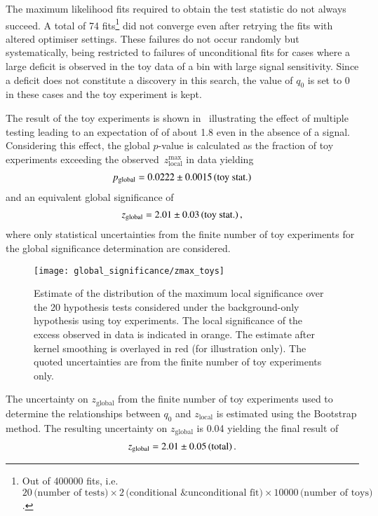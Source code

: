 The maximum likelihood fits required to obtain the test statistic do not always
succeed. A total of \num{74} fits\footnote{Out of \num{400000} fits, i.e.\
  $20\,\text{(number of tests)} \times 2\,\text{(conditional \& unconditional
    fit)} \times \num{10000}\,\text{(number of toys)}$.}  did not converge even
after retrying the fits with altered optimiser settings. These failures do not
occur randomly but systematically, being restricted to failures of unconditional
fits for cases where a large deficit is observed in the toy data of a bin with
large signal sensitivity. Since a deficit does not constitute a discovery in
this search, the value of $q_0$ is set to 0 in these cases and the toy
experiment is kept.

The result of the toy experiments is shown in~ illustrating
the effect of multiple testing leading to an expectation of \Zmaxlocal of about
\num{1.8} even in the absence of a signal. Considering this effect, the global
$p$-value is calculated as the fraction of toy experiments exceeding the
observed~$z_{\text{local}}^{\text{max}}$ in data yielding
\begin{align*}
  \pglobal = \num{0.0222}\numerrt{0.0015}{toy stat.}
\end{align*}
and an equivalent global significance of
\begin{align*}
  z_{\text{global}} = \num{2.01}\numerrt{0.03}{toy stat.} \,\text{,}
\end{align*}
where only statistical uncertainties from the finite number of toy experiments
for the global significance determination are considered.

\begin{figure}[htbp]
  \centering

  \texttt{[image: global\_significance/zmax\_toys]}

  \caption{Estimate of the distribution of the maximum local significance over
    the 20 hypothesis tests considered under the background-only hypothesis
    using toy experiments. The local significance of the excess observed in data
    is indicated in orange. The estimate after kernel smoothing is overlayed in
    red (for illustration only). The quoted uncertainties are from the finite
    number of toy experiments only.}%
  \label{fig:zmax_toys}
\end{figure}

The uncertainty on $z_{\text{global}}$ from the finite number of toy experiments
used to determine the relationships between $q_0$ and $z_{\text{local}}$ is
estimated using the Bootstrap method. The resulting uncertainty on
$z_{\text{global}}$ is \num{0.04} yielding the final result of
\begin{align*}
  z_{\text{global}} = \num{2.01}\numerrt{0.05}{total} \,\text{.}
\end{align*}

